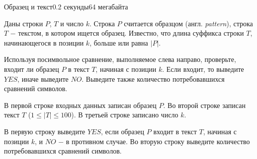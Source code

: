 \begin{problem}{Образец и текст}{}{}{0.2 секунды}{64 мегабайта}

Даны строки $P$, $T$ и число $k$. Строка $P$ считается образцом (англ. {\it pattern}), строка $T$ $-$ текстом, в котором ищется образец. 
Известно, что длина суффикса строки $T$, начинающегося в позиции $k$, больше или равна $|P|$. 

Используя посимвольное сравнение, выполняемое слева направо, проверьте, входит ли образец $P$ в текст $T$, начиная с позиции $k$. 
Если входит, то выведите $YES$, иначе выведите $NO$. Выведите также количество потребовавшихся сравнений символов. 

\InputFile
В первой строке входных данных записан образец $P$.
Во второй строке записан текст $T$ ($1 \le |T| \le 100$).
В третьей строке записано число $k$.

\OutputFile
В первую строку выведите $YES$, если  образец $P$ входит в текст $T$, 
начиная с позиции $k$, и $NO$ $-$ в противном случае.
Во вторую строку выведите количество потребовавшихся сравнений символов.

\Examples

\begin{example}
%
%
\end{example}

\end{problem}
